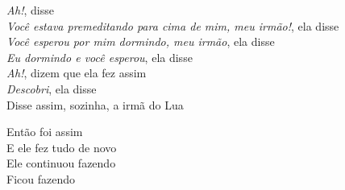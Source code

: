 \begin{linenumbers}\begingroup\raggedright
\noindent \emph{Ah!}, disse\\
\emph{Você estava premeditando para cima de mim, meu irmão!}, ela disse\\
\emph{Você esperou por mim dormindo, meu irmão}, ela disse\\
\emph{Eu dormindo e você esperou}, ela disse\\
\emph{Ah!}, dizem que ela fez assim\\
\emph{Descobri}, ela disse\\
Disse assim, sozinha, a irmã do Lua
\end{linenumbers}\endgroup

\bigskip

\begin{linenumbers}\begingroup\raggedright
\noindent Então foi assim\\
E ele fez tudo de novo\\
Ele continuou fazendo\\
Ficou fazendo
\end{linenumbers}\endgroup

\bigskip

